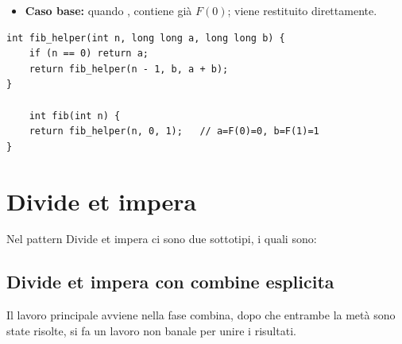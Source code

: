 \begin{codeexample}
{\begin{itemize}

      \item \textbf{Caso base:} quando ,
             contiene già $F(0)$; viene restituito
            direttamente.
            \vspace{0.1cm}

    \end{itemize}\vspace*{-\baselineskip}
  }

  \begin{codebox}
    \begin{lstlisting}
int fib_helper(int n, long long a, long long b) {
    if (n == 0) return a;
    return fib_helper(n - 1, b, a + b);
}

    int fib(int n) {
    return fib_helper(n, 0, 1);   // a=F(0)=0, b=F(1)=1
}
    \end{lstlisting}
  \end{codebox}

\end{codeexample}













\section{Divide et impera}

Nel pattern Divide et impera ci sono due sottotipi, i quali sono:
\subsection{Divide et impera con combine esplicita}
Il lavoro principale avviene nella fase combina, dopo che entrambe la metà sono state risolte, si fa un lavoro non banale per unire i  risultati. 


